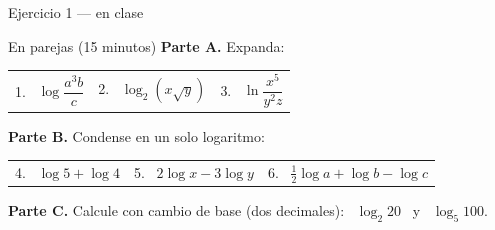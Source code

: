 \documentclass[aspectratio=169,10pt]{beamer}
\begin{document}
\begin{frame}{Ejercicio 1 — en clase}
  \begin{alertblock}{En parejas (15 minutos)}
    \scriptsize
    \textbf{Parte A.} Expanda:

    \vspace{0.1cm}
    \centering
    \begin{tabular}{@{}lll@{}}
      1. \ $\log\dfrac{a^{3}b}{c}$ &
      2. \ $\log_{2}\left(x\sqrt{y}\right)$ &
      3. \ $\ln\dfrac{x^{5}}{y^{2}z}$ \\
    \end{tabular}

    \vspace{0.2cm}
    \raggedright
    \textbf{Parte B.} Condense en un solo logaritmo:

    \vspace{0.1cm}
    \centering
    \begin{tabular}{@{}lll@{}}
      4. \ $\log 5 + \log 4$ &
      5. \ $2\log x - 3\log y$ &
      6. \ $\tfrac{1}{2}\log a + \log b - \log c$ \\
    \end{tabular}

    \vspace{0.2cm}
    \raggedright
    \textbf{Parte C.} Calcule con cambio de base (dos decimales):
    \ $\log_{2}20$ \ y \ $\log_{5}100$.
  \end{alertblock}
\end{frame}
\end{document}
